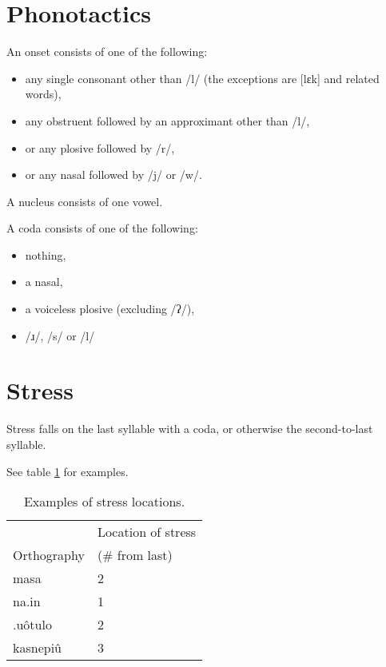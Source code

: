 \documentclass{book}
\begin{document}
\section{Phonotactics}

An onset consists of one of the following:

\begin{itemize}
    \item any single consonant other than /l/ (the exceptions are  [lɛk] and related words),
    \item any obstruent followed by an approximant other than /l/,
    \item or any plosive followed by /r/,
    \item or any nasal followed by /j/ or /w/.
\end{itemize}

A nucleus consists of one vowel.

A coda consists of one of the following:

\begin{itemize}
    \item nothing,
    \item a nasal,
    \item a voiceless plosive (excluding /ʔ/),
    \item /ɹ/, /s/ or /l/
\end{itemize}

\section{Stress}

Stress falls on the last syllable with a coda, or otherwise the second-to-last syllable.

See table \ref{table:stress} for examples.

\begin{table}[ht]
    \caption{Examples of stress locations. \label{table:stress}}
    \centering
    \begin{tabular}{|>{\kardinal}l|l|}
        \hline
        & Location of stress \\
        \textnormal{Orthography} & (\# from last) \\
        \hline
        masa & 2 \\
        na.in & 1 \\
        .u\^otulo & 2 \\
        kasnepi\^u & 3 \\
        \hline
    \end{tabular}
\end{table}
\end{document}
